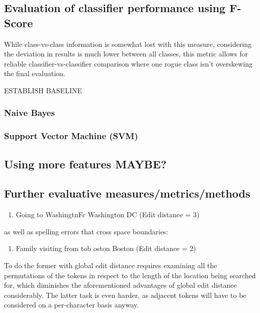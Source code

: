 \documentclass[twocolumn]{article}
\begin{document}
\subsection{Evaluation of classifier performance using F-Score}
While class-vs-class information is somewhat lost with this measure, considering the deviation in results is much lower between all classes, this metric allows for reliable classifier-vs-classifier comparison where one rogue class isn't overskewing the final evaluation.

    ESTABLISH BASELINE

\subsubsection{Naive Bayes}

\subsubsection{Support Vector Machine (SVM)}

\subsection{Using more features MAYBE?}

\subsection{Further evaluative measures/metrics/methods}

\begin{enumerate}
\item Going to WashingtnFc \textrightarrow Washington DC (Edit distance = 3)
\end{enumerate}

as well as spelling errors that cross space boundaries:

\begin{enumerate}[resume]
\item Family visiting from tob oston \textrightarrow Boston (Edit distance = 2)
\end{enumerate}

To do the former with global edit distance requires examining all the permutations of the tokens in respect to the length of the location being searched for, which diminishes the aforementioned advantages of global edit distance considerably. The latter task is even harder, as adjacent tokens will have to be considered on a per-character basis anyway.
\end{document}
